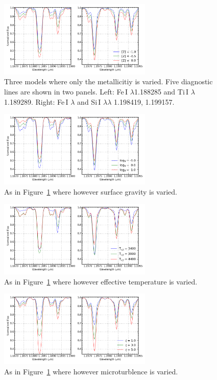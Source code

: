 \begin{figure}
 \centering
\includegraphics[width=0.65\textwidth]{JAnal/varyZv2}
\caption{
Three models where only the metallicitiy is varied.
Five diagnostic lines are shown in two panels.
Left: Fe\,I $\lambda$1.188285 and Ti\,I $\lambda$ 1.189289.
Right: Fe\,I $\lambda$ and Si\,I $\lambda\lambda$ 1.198419, 1.199157.\label{fig:mod-z}
         }
\end{figure}

\begin{figure}
 \centering
\includegraphics[width=0.65\textwidth]{JAnal/varygv2}
\caption{
As in Figure~\ref{fig:mod-z} where however surface gravity is varied.\label{fig:mod-g}
         }
\end{figure}

\begin{figure}
 \centering
\includegraphics[width=0.65\textwidth]{JAnal/varyTv2}
\caption{
As in Figure~\ref{fig:mod-z} where however effective temperature is varied.\label{fig:mod-t}
         }
\end{figure}

\begin{figure}
 \centering
\includegraphics[width=0.65\textwidth]{JAnal/varymicrov2}
\caption{
As in Figure~\ref{fig:mod-z} where however microturblence is varied.\label{fig:mod-micro}
         }
\end{figure}

